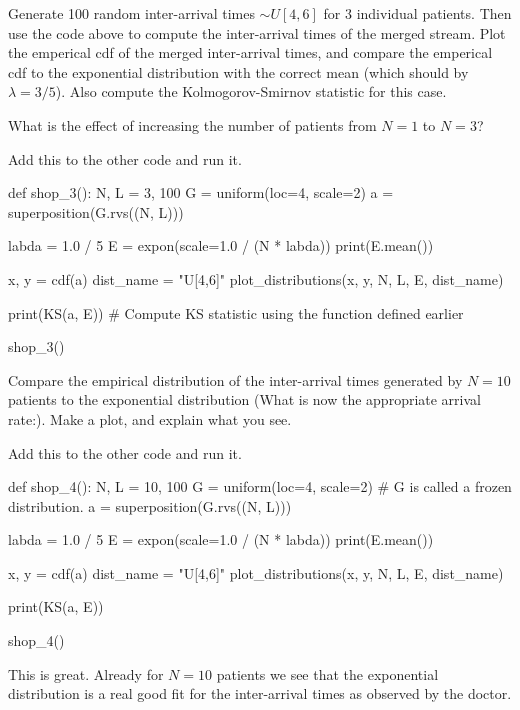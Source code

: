 \begin{exercise}
  Generate 100 random inter-arrival times $\sim U[4,6]$ for 3 individual patients.
  Then use the code above to compute the inter-arrival times of the merged stream.
  Plot the emperical cdf of the merged inter-arrival times, and compare the emperical cdf to the exponential distribution with the correct mean (which should by $\lambda = 3/5$).
  Also compute the Kolmogorov-Smirnov statistic for this case.

  What is the effect of increasing the number of patients from $N=1$ to $N=3$?
\begin{solution}
Add this to the other code and run it.
\begin{pyverbatim}
def shop_3():
    N, L = 3, 100
    G = uniform(loc=4, scale=2)
    a = superposition(G.rvs((N, L)))

    labda = 1.0 / 5
    E = expon(scale=1.0 / (N * labda))
    print(E.mean())

    x, y = cdf(a)
    dist_name = "U[4,6]"
    plot_distributions(x, y, N, L, E, dist_name)

    print(KS(a, E))  # Compute KS statistic using the function defined earlier

shop_3()
\end{pyverbatim}

\end{solution}
\end{exercise}


\begin{exercise}
  Compare the empirical distribution of the inter-arrival times generated by $N=10$ patients to the exponential distribution (What is now the appropriate arrival rate:).
  Make a plot, and explain what you see.
\begin{solution}
Add this to the other code and run it.
\begin{pyverbatim}
def shop_4():
    N, L = 10, 100
    G = uniform(loc=4, scale=2)  # G is called a frozen distribution.
    a = superposition(G.rvs((N, L)))

    labda = 1.0 / 5
    E = expon(scale=1.0 / (N * labda))
    print(E.mean())

    x, y = cdf(a)
    dist_name = "U[4,6]"
    plot_distributions(x, y, N, L, E, dist_name)

    print(KS(a, E))

shop_4()
\end{pyverbatim}

This is great.
Already for $N=10$ patients we see that the exponential distribution is a real good fit for the inter-arrival times as observed by the doctor.
\end{solution}
\end{exercise}



